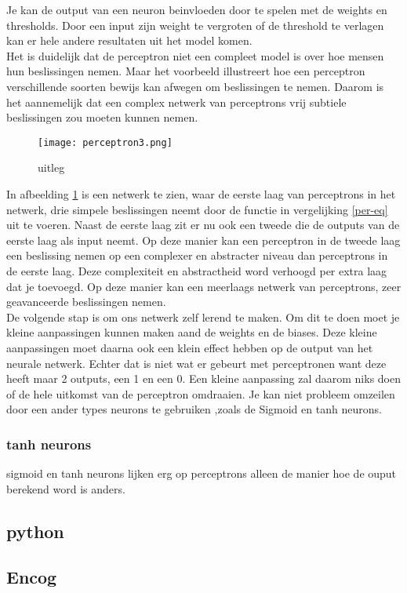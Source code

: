 \noindent Je kan de output van een neuron beinvloeden door te spelen met de weights en thresholds. Door een input zijn weight te vergroten of de threshold te verlagen kan er hele andere resultaten uit het model komen.\\
\newline
Het is duidelijk dat de perceptron niet een compleet model is over hoe mensen hun beslissingen nemen. Maar het voorbeeld illustreert hoe een perceptron verschillende soorten bewijs kan afwegen om beslissingen te nemen. Daarom is het aannemelijk dat een complex netwerk van perceptrons vrij subtiele beslissingen zou moeten kunnen nemen.
\begin{figure}[h!]
\centering
\texttt{[image: perceptron3.png]}
\caption{uitleg}
\label{perceptron3}
\end{figure}
\newline
In afbeelding \ref{perceptron3} is een netwerk te zien, waar de eerste laag van perceptrons in het netwerk, drie simpele beslissingen neemt door de functie in vergelijking \ref{per-eq} uit te voeren. Naast de eerste laag zit er nu ook een tweede die de outputs van de eerste laag als input neemt. Op deze manier kan een perceptron in de tweede laag een beslissing nemen op een complexer en abstracter niveau dan perceptrons in de eerste laag. Deze complexiteit en abstractheid word verhoogd per extra laag dat je toevoegd. Op deze manier kan een meerlaags netwerk van perceptrons, zeer geavanceerde beslissingen nemen.\\
\newline
De volgende stap is om ons netwerk zelf lerend te maken. Om dit te doen moet je kleine aanpassingen kunnen maken aand de weights en de biases. Deze kleine aanpassingen moet daarna ook een klein effect hebben op de output van het neurale netwerk. Echter dat is niet wat er gebeurt met perceptronen want deze heeft maar 2 outputs, een 1 en een 0. Een kleine aanpassing zal daarom niks doen of de hele uitkomst van de perceptron omdraaien. Je kan niet probleem omzeilen door een ander types neurons te gebruiken ,zoals de Sigmoid en tanh neurons.

\subsubsection{tanh neurons}
sigmoid en tanh neurons lijken erg op perceptrons alleen de manier hoe de ouput berekend word is anders. 


\subsection{python}

\subsection{Encog}